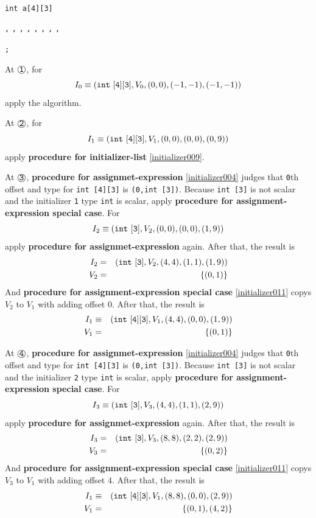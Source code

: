 \begin{Example}

\

{\tt int a[4][3]  }

{\tt {},}
{\tt {},}
{\tt {},}
{\tt {},}
{\tt {},}
{\tt {},}
{\tt {},}
{\tt {},}
{\tt {}}

{\tt {};}

\noindent
At $\MARU{\tt 1}$, for
\[
I_0 \equiv ({\tt{int\,\,[4][3]}}, V_0, (0,0),(-1,-1),(-1,-1))
\]
apply the algorithm.

\noindent
At $\MARU{\tt 2}$, for
\[
I_1 \equiv ({\tt{int\,\,[4][3]}}, V_1, (0,0),(0,0),(0,9))
\]
apply {\bf procedure for initializer-list} \ref{initializer009}.

\noindent
At $\MARU{\tt 3}$,
{\bf procedure for assignmet-expression}
\ref{initializer004} judges that
{\tt{0}}th offset and type for {\tt int [4][3]} 
is {\tt (0,int [3])}.
Because {\tt int [3]} is not scalar and the initializer {\tt{1}}
type {\tt int} is scalar, apply
{\bf procedure for assignment-expression special case}.
For
\[
I_2 \equiv ({\tt{int\,\,[3]}},V_2,(0,0),(0,0),(1,9))
\]
apply {\bf procedure for assignmet-expression} again.
After that, the result is
\begin{eqnarray*}
I_2 & = & ({\tt{int\,\,[3]}},V_2,(4,4),(1,1),(1,9)) \\
V_2 & = & \{(0,1)\}
\end{eqnarray*}
And 
{\bf procedure for assignment-expression special case} 
\ref{initializer011} copys
$V_2$ to $V_1$ with adding offset $0$.
After that, the result is
\begin{eqnarray*}
I_1 & \equiv & ({\tt{int\,\,[4][3]}}, V_1, (4,4),(0,0),(1,9)) \\
V_1 & = & \{(0,1)\}
\end{eqnarray*}

\noindent
At $\MARU{\tt 4}$,
{\bf procedure for assignmet-expression}
\ref{initializer004} judges that
{\tt{0}}th offset and type for {\tt int [4][3]} is
{\tt (0,int [3])}.
Because {\tt int [3]} is not scalar and the initializer {\tt{2}}
type {\tt int} is scalar, apply
{\bf procedure for assignment-expression special case}.
For
\[
I_3 \equiv ({\tt{int\,\,[3]}},V_3,(4,4),(1,1),(2,9))
\]
apply {\bf procedure for assignmet-expression} again.
After that, the result is
\begin{eqnarray*}
I_3 & = & ({\tt{int\,\,[3]}},V_3,(8,8),(2,2),(2,9)) \\
V_3 & = & \{(0,2)\}
\end{eqnarray*}
And 
{\bf procedure for assignment-expression special case} 
\ref{initializer011} copys
$V_3$ to $V_1$ with adding offset $4$.
After that, the result is
\begin{eqnarray*}
I_1 & \equiv & ({\tt{int\,\,[4][3]}}, V_1, (8,8),(0,0),(2,9)) \\
V_1 & = & \{(0,1), (4,2)\}
\end{eqnarray*}


\end{Example}
